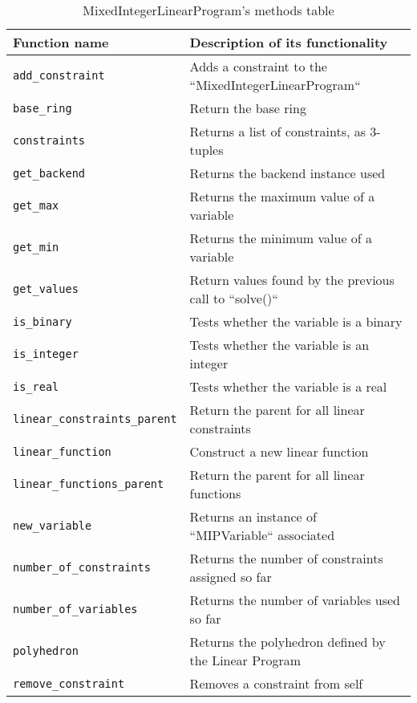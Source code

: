 \begin{table}
    \caption{MixedIntegerLinearProgram's methods table}
\label{table:mip}

\begin{center}
  \begin{tabular}{ | l |  l |}
    \hline
Function name& Description of its functionality\\
    \hline    
\texttt{add\_constraint}&             Adds a constraint to the ``MixedIntegerLinearProgram`` \\ 
\texttt{base\_ring}&                  Return the base ring\\
\texttt{constraints}&                Returns a list of constraints, as 3-tuples\\
\texttt{get\_backend}&                Returns the backend instance used\\
\texttt{get\_max}&                    Returns the maximum value of a variable\\
\texttt{get\_min}&                    Returns the minimum value of a variable\\
\texttt{get\_values}&                 Return values found by the previous call to ``solve()``\\
\texttt{is\_binary}&                  Tests whether the variable is a binary\\
\texttt{is\_integer}&                 Tests whether the variable is an integer\\
\texttt{is\_real}&                    Tests whether the variable is a real\\
\texttt{linear\_constraints\_parent}&  Return the parent for all linear constraints\\
\texttt{linear\_function}&            Construct a new linear function\\
\texttt{linear\_functions\_parent}&    Return the parent for all linear functions\\
\texttt{new\_variable}&               Returns an instance of ``MIPVariable`` associated\\
\texttt{number\_of\_constraints}&      Returns the number of constraints assigned so far\\
\texttt{number\_of\_variables}&        Returns the number of variables used so far\\
\texttt{polyhedron}&                 Returns the polyhedron defined by the Linear Program\\
\texttt{remove\_constraint}&          Removes a constraint from self\\

\end{tabular}
\end{center}
\end{table}
